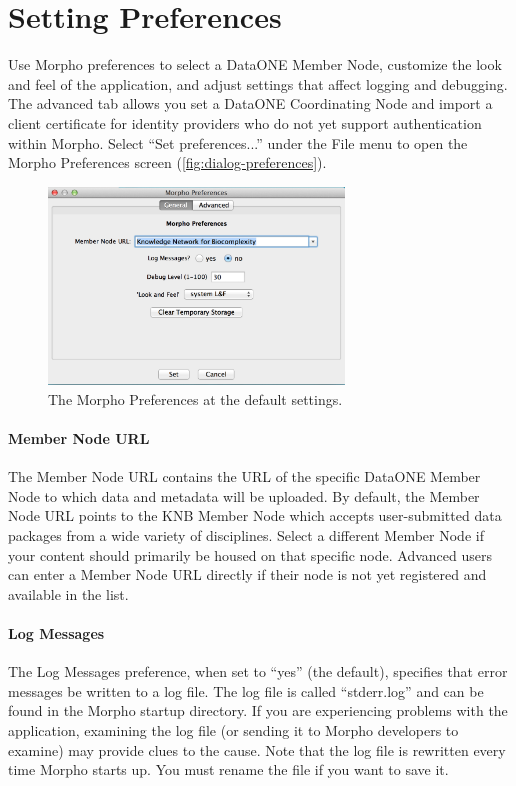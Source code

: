 \section{Setting Preferences} \label{sec:preferences}

Use Morpho preferences to select a DataONE
Member Node, customize the look and feel
of the application, and adjust settings that affect logging and
debugging. The advanced tab allows you set a DataONE Coordinating Node 
and import a client certificate for identity providers who do not 
yet support authentication within Morpho. 
Select ``Set preferences...'' under the File menu to open the
Morpho Preferences screen (\autoref{fig:dialog-preferences}).

\begin{figure}
  \centering
    \includegraphics[width=0.7\textwidth]{images/dialog-preferences.png}
  \caption{The Morpho Preferences at the default settings.}
  \label{fig:dialog-preferences}
\end{figure}

\paragraph{Member Node URL} The Member Node URL contains the URL of the specific
DataONE Member Node to which data and metadata will be uploaded. By default, the 
Member Node URL points to the KNB Member Node which accepts user-submitted 
data packages from a wide variety of disciplines. Select a different Member Node 
if your content should primarily be housed on that specific node.
Advanced users can enter a Member Node URL directly if their node is not yet 
registered and available in the list.

\paragraph{Log Messages} The Log Messages preference, when set to ``yes'' (the
default), specifies that error messages be written to a log file. The
log file is called ``stderr.log'' and can be found in the Morpho startup
directory. If you are experiencing problems with the application,
examining the log file (or sending it to Morpho developers to examine)
may provide clues to the cause. Note that the log file is rewritten
every time Morpho starts up. You must rename the file if you want to
save it.

